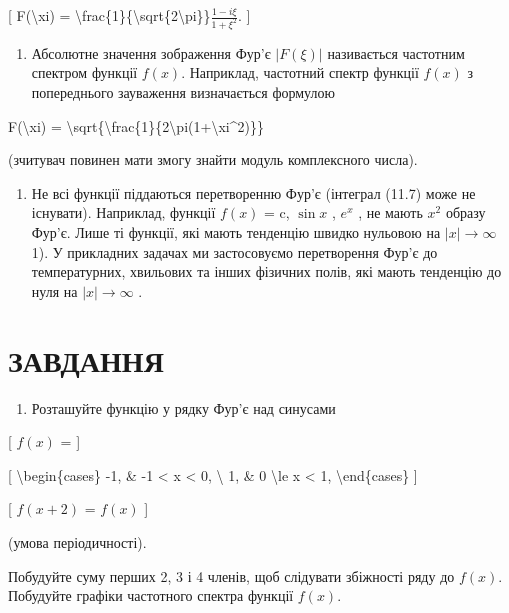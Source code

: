\documentclass[
]{article}
\providecommand{\tightlist}{%
  \setlength{\itemsep}{0pt}\setlength{\parskip}{0pt}}
\begin{document}
{{{[} F(\textbackslash xi) =
\textbackslash frac\{1\}\{\textbackslash sqrt\{2\textbackslash pi\}\}\(\frac{1 - i\xi}{1 + \xi^2}\).
{]}

\begin{enumerate}
\def\labelenumi{\arabic{enumi}.}
\setcounter{enumi}{1}
\tightlist
\item
  Абсолютне значення зображення Фур'є \(|F(\xi)|\) називається частотним
  спектром функції \(f(x)\). Наприклад, частотний спектр функції
  \(f(x)\) з попереднього зауваження визначається формулою
\end{enumerate}

\textbar F(\textbackslash xi)\textbar{} =
\textbackslash sqrt\{\textbackslash frac\{1\}\{2\textbackslash pi(1+\textbackslash xi\^{}2)\}\}

(зчитувач повинен мати змогу знайти модуль комплексного числа).

\begin{enumerate}
\def\labelenumi{\arabic{enumi}.}
\setcounter{enumi}{2}
\tightlist
\item
  Не всі функції піддаються перетворенню Фур'є (інтеграл (11.7) може не
  існувати). Наприклад, функції \(f(x)\) = c, \(\sin x\) , \(e^x\) , не
  мають \(x^2\) образу Фур'є. Лише ті функції, які мають тенденцію
  швидко нульовою на \(|x| \to \infty\) 1). У прикладних задачах ми
  застосовуємо перетворення Фур'є до температурних, хвильових та інших
  фізичних полів, які мають тенденцію до нуля на \(|x| \to \infty\) .
\end{enumerate}

\section{ЗАВДАННЯ}\label{ux437ux430ux432ux434ux430ux43dux43dux44f-7}

\begin{enumerate}
\def\labelenumi{\arabic{enumi}.}
\tightlist
\item
  Розташуйте функцію у рядку Фур'є над синусами
\end{enumerate}

{[} \(f(x)\) = {]}

{[} \textbackslash begin\{cases\} -1, \& -1 \textless{} x \textless{} 0,
\textbackslash{} 1, \& 0 \textbackslash le x \textless{} 1,
\textbackslash end\{cases\} {]}

{[} \(f(x+2)\) = \(f(x)\) {]}

(умова періодичності).

Побудуйте суму перших 2, 3 і 4 членів, щоб слідувати збіжності ряду до
\(f(x)\). Побудуйте графіки частотного спектра функції \(f(x)\).

}}
\end{document}
